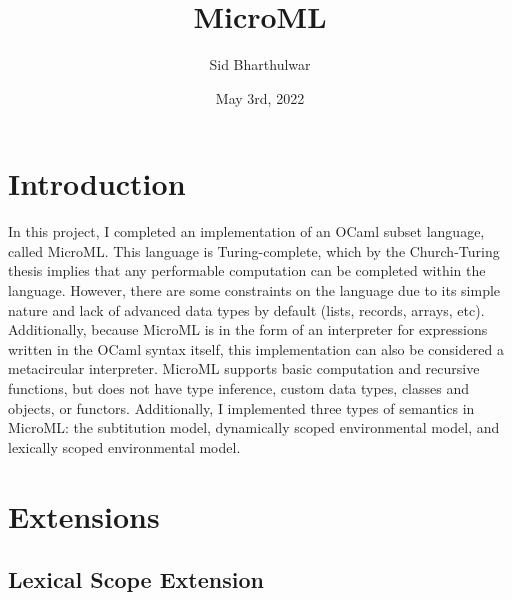 \documentclass{article}
\title{MicroML}
\author{Sid Bharthulwar}
\date{May 3rd, 2022}
\begin{document}
\maketitle

\section{Introduction}

In this project, I completed an implementation of an OCaml subset language, called MicroML. This language is Turing-complete, which by the Church-Turing thesis implies that any performable computation can be completed within the language. However, there are some constraints on the language due to its simple nature and lack of advanced data types by default (lists, records, arrays, etc). Additionally, because MicroML is in the form of an interpreter for expressions written in the OCaml syntax itself, this implementation can also be considered a metacircular interpreter.  MicroML supports basic computation and recursive functions, but does not have type inference, custom data types, classes and objects, or functors. Additionally, I implemented three types of semantics in MicroML: the subtitution model, dynamically scoped environmental model, and lexically scoped environmental model. 

\section{Extensions}

\subsection{Lexical Scope Extension}
\end{document}
